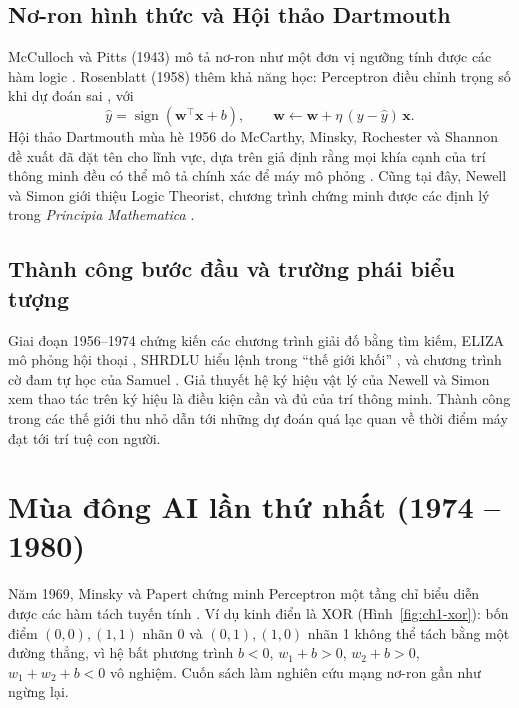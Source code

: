 \subsection{Nơ-ron hình thức và Hội thảo Dartmouth}
McCulloch và Pitts (1943) mô tả nơ-ron như một đơn vị ngưỡng tính được các hàm logic \cite{ch1:mcculloch1943}. Rosenblatt (1958) thêm
khả năng học: Perceptron điều chỉnh trọng số khi dự đoán sai \cite{ch1:rosenblatt1958}, với
\begin{equation}
  \hat y=\operatorname{sign}(\mathbf{w}^\top\mathbf{x}+b),\qquad \mathbf{w}\leftarrow\mathbf{w}+\eta\,(y-\hat y)\,\mathbf{x}.
\end{equation}
Hội thảo Dartmouth mùa hè 1956 do McCarthy, Minsky, Rochester và Shannon đề xuất đã đặt tên cho lĩnh vực, dựa trên giả định rằng mọi khía
cạnh của trí thông minh đều có thể mô tả chính xác để máy mô phỏng \cite{ch1:mccarthy2006}. Cũng tại đây, Newell và Simon giới thiệu Logic
Theorist, chương trình chứng minh được các định lý trong \emph{Principia Mathematica} \cite{ch1:newell1956}.


\subsection{Thành công bước đầu và trường phái biểu tượng}
Giai đoạn 1956--1974 chứng kiến các chương trình giải đố bằng tìm kiếm, ELIZA mô phỏng hội thoại \cite{ch1:weizenbaum1966}, SHRDLU hiểu
lệnh trong ``thế giới khối'' \cite{ch1:winograd1972}, và chương trình cờ đam tự học của Samuel \cite{ch1:samuel1959}. Giả thuyết hệ ký
hiệu vật lý của Newell và Simon \cite{ch1:newell1976} xem thao tác trên ký hiệu là điều kiện cần và đủ của trí thông minh. Thành công
trong các thế giới thu nhỏ dẫn tới những dự đoán quá lạc quan về thời điểm máy đạt tới trí tuệ con người.

\section{Mùa đông AI lần thứ nhất (1974 -- 1980)}
Năm 1969, Minsky và Papert chứng minh Perceptron một tầng chỉ biểu diễn được các hàm tách tuyến tính \cite{ch1:minsky1969}. Ví dụ kinh
điển là XOR (Hình~\ref{fig:ch1-xor}): bốn điểm $(0,0),(1,1)$ nhãn 0 và $(0,1),(1,0)$ nhãn 1 không thể tách bằng một đường thẳng, vì
hệ bất phương trình $b<0$, $w_1+b>0$, $w_2+b>0$, $w_1+w_2+b<0$ vô nghiệm. Cuốn sách làm nghiên cứu mạng nơ-ron gần như ngừng lại.

